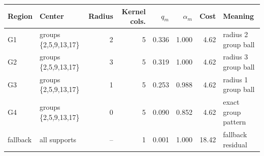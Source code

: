 \begin{tabularx}{\textwidth}{@{}lXrrrrrX@{}}
\toprule
Region & Center & Radius & Kernel cols. & $q_m$ & $\alpha_m$ & Cost & Meaning \\
\midrule
G1 & groups \{2,5,9,13,17\} & 2 & 5 & 0.336 & 1.000 & 4.62 & radius 2 group ball \\
G2 & groups \{2,5,9,13,17\} & 3 & 5 & 0.319 & 1.000 & 4.62 & radius 3 group ball \\
G3 & groups \{2,5,9,13,17\} & 1 & 5 & 0.253 & 0.988 & 4.62 & radius 1 group ball \\
G4 & groups \{2,5,9,13,17\} & 0 & 5 & 0.090 & 0.852 & 4.62 & exact group pattern \\
fallback & all supports & -- & 1 & 0.001 & 1.000 & 18.42 & fallback residual \\
\bottomrule
\end{tabularx}
